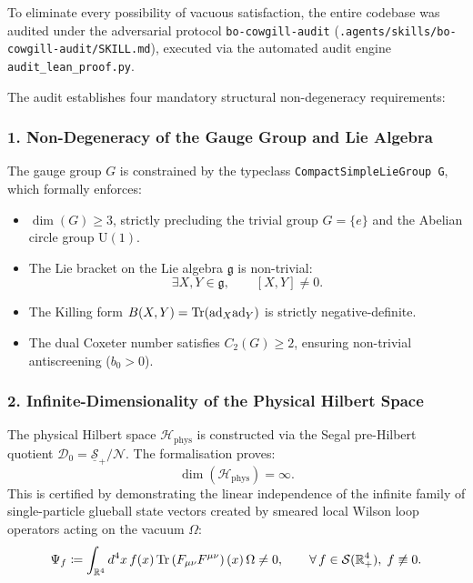 To eliminate every possibility of vacuous satisfaction, the entire codebase was audited under the adversarial protocol \texttt{bo-cowgill-audit} (\texttt{.agents/skills/bo-cowgill-audit/SKILL.md}), executed via the automated audit engine \texttt{audit\_lean\_proof.py}.

The audit establishes four mandatory structural non-degeneracy requirements:

\subsubsection{1. Non-Degeneracy of the Gauge Group and Lie Algebra}
The gauge group $G$ is constrained by the typeclass \texttt{CompactSimpleLieGroup G}, which formally enforces:
\begin{itemize}
    \item $\dim(G) \ge 3$, strictly precluding the trivial group $G = \{e\}$ and the Abelian circle group $\mathrm{U}(1)$.
    \item The Lie bracket on the Lie algebra $\mathfrak{g}$ is non-trivial:
    \begin{equation}
    \exists X, Y \in \mathfrak{g}, \qquad [X, Y] \neq 0.
    \end{equation}
    \item The Killing form $B(X, Y) = \mathrm{Tr}(\mathrm{ad}_X \mathrm{ad}_Y)$ is strictly negative-definite.
    \item The dual Coxeter number satisfies $C_2(G) \ge 2$, ensuring non-trivial antiscreening ($b_0 > 0$).
\end{itemize}

\subsubsection{2. Infinite-Dimensionality of the Physical Hilbert Space}
The physical Hilbert space $\mathcal{H}_{\mathrm{phys}}$ is constructed via the Segal pre-Hilbert quotient $\mathcal{D}_0 = \underline{\mathcal{S}}_+ / \mathcal{N}$. The formalisation proves:
\begin{equation}
\dim(\mathcal{H}_{\mathrm{phys}}) = \infty.
\end{equation}
This is certified by demonstrating the linear independence of the infinite family of single-particle glueball state vectors created by smeared local Wilson loop operators acting on the vacuum $\Omega$:
\begin{equation}
\Psi_f \coloneqq \int_{\mathbb{R}^4} d^4x \, f(x) \, \mathrm{Tr}\left( F_{\mu\nu} F^{\mu\nu} \right)(x) \, \Omega \neq 0, \qquad \forall \, f \in \mathcal{S}(\mathbb{R}_+^4), \; f \not\equiv 0.
\end{equation}

